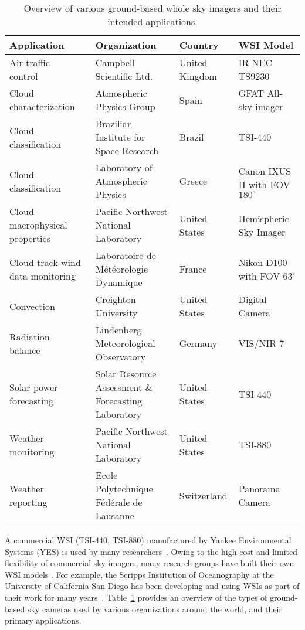 \begin{table}[htb]
\footnotesize
\centering
\begin{tabular}{ p{1.7in}|p{1.8in}|l|p{1in} }
\hline 
\textbf{Application}  & \textbf{Organization} & \textbf{Country} &  \textbf{WSI Model}  \\
\hline
Air traffic control~\cite{infrared_UK} & Campbell Scientific Ltd. & United Kingdom & IR NEC TS9230  \\   
Cloud characterization~\cite{sky_imager2008}& Atmospheric Physics Group & Spain & GFAT All-sky imager\\ 
Cloud classification~\cite{Sylvio} & Brazilian Institute for Space Research & Brazil & TSI-440\\
Cloud classification~\cite{Kazantzidis2012} & Laboratory of Atmospheric Physics & Greece & Canon IXUS II with FOV $180^{\circ}$   \\ 
Cloud macrophysical properties~\cite{Long} & Pacific Northwest National Laboratory & United States & Hemispheric Sky Imager\\ 
Cloud track wind data monitoring~\cite{synerg} & Laboratoire de M\'et\'eorologie Dynamique & France & Nikon D100 with FOV $63^{\circ}$\\ 
Convection~\cite{orograph2007}& Creighton University & United States & Digital Camera   \\ 
Radiation balance~\cite{uwe2000}& Lindenberg Meteorological Observatory & Germany & VIS/NIR 7   \\  
Solar power forecasting~\cite{Ghonima2012}& Solar Resource Assessment \& Forecasting Laboratory & United States & TSI-440 \\ 
Weather monitoring~\cite{TSI880} & Pacific Northwest National Laboratory & United States & TSI-880\\ 
Weather reporting~\cite{how_weather}& Ecole Polytechnique F\'ed\'erale de Lausanne & Switzerland & Panorama Camera\\ 
\hline  
\end{tabular}
\caption{Overview of various ground-based whole sky imagers and their intended applications.}
\label{tab:diff-database}
\end{table}

A commercial WSI (\mbox{TSI-440}, \mbox{TSI-880}) manufactured by Yankee Environmental Systems (YES) is used by many researchers~\cite{Long,Souza,Ghonima2012}. Owing to the high cost and limited flexibility of commercial sky imagers, many research groups have built their own WSI models \cite{Sylvio,sky_imager2008,Kazantzidis2012,synerg,orograph2007,uwe2000,infrared_UK,how_weather}. For example, the Scripps Institution of Oceanography at the University of California San Diego has been developing and using WSIs as part of their work for many years~\cite{WSI_UCSD}. Table~\ref{tab:diff-database} provides an overview of the types of ground-based sky cameras used by various organizations around the world, and their primary applications. 

